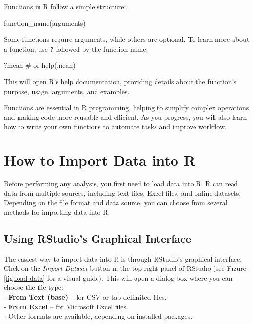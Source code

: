 \documentclass[
  11pt,
]{book}
\makeatletter
\newenvironment{Shaded}{}{}
\newcommand{\CommentTok}[1]{\textcolor[rgb]{0.36,0.36,0.36}{#1}}
\newcommand{\FunctionTok}[1]{#1}
\newcommand{\NormalTok}[1]{#1}
\newenvironment{kframe}{%
\medskip{}
\setlength{\fboxsep}{.8em}
 \def\at@end@of@kframe{}%
 \ifinner\ifhmode%
  \def\at@end@of@kframe{\end{minipage}}%
  \begin{minipage}{\columnwidth}%
 \fi\fi%
 \def\FrameCommand##1{\hskip\@totalleftmargin \hskip-\fboxsep
 \colorbox{shadecolor}{##1}\hskip-\fboxsep
     \hskip-\linewidth \hskip-\@totalleftmargin \hskip\columnwidth}%
 \MakeFramed {\advance\hsize-\width
   \@totalleftmargin\z@ \linewidth\hsize
   \@setminipage}}%
 {\par\unskip\endMakeFramed%
 \at@end@of@kframe}
\renewenvironment{Shaded}{\begin{kframe}}{\end{kframe}}
\theoremstyle{definition}
\theoremstyle{definition}
\theoremstyle{definition}
\theoremstyle{definition}
\theoremstyle{remark}
\makeatother
\begin{document}
Functions in R follow a simple structure:

\begin{Shaded}
\begin{Highlighting}[]
\FunctionTok{function\_name}\NormalTok{(arguments)}
\end{Highlighting}
\end{Shaded}

Some functions require arguments, while others are optional. To learn more about a function, use \texttt{?} followed by the function name:

\begin{Shaded}
\begin{Highlighting}[]
\NormalTok{?mean  }\CommentTok{\# or help(mean)}
\end{Highlighting}
\end{Shaded}

This will open R's help documentation, providing details about the function's purpose, usage, arguments, and examples.

Functions are essential in R programming, helping to simplify complex operations and making code more reusable and efficient. As you progress, you will also learn how to write your own functions to automate tasks and improve workflow.

\section{How to Import Data into R}\label{how-to-import-data-into-r}

Before performing any analysis, you first need to load data into R. R can read data from multiple sources, including text files, Excel files, and online datasets. Depending on the file format and data source, you can choose from several methods for importing data into R.

\subsection*{Using RStudio's Graphical Interface}\label{using-rstudios-graphical-interface}


The easiest way to import data into R is through RStudio's graphical interface. Click on the \emph{Import Dataset} button in the top-right panel of RStudio (see Figure \ref{fig:load-data} for a visual guide). This will open a dialog box where you can choose the file type:\\
- \textbf{From Text (base)} -- for CSV or tab-delimited files.\\
- \textbf{From Excel} -- for Microsoft Excel files.\\
- Other formats are available, depending on installed packages.
\end{document}
